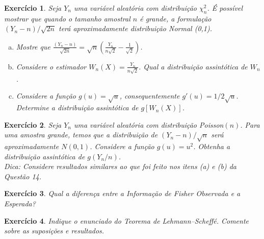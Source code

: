 \documentclass[letter,11pt]{article}
\newtheorem{exer}{Exercício}
\begin{document}
\begin{exer} \rm
Seja $Y_n$ uma variável aleatória com distribuição $\chi^2_n$. É possível mostrar que quando o tamanho amostral $n$ é grande, a formulação $(Y_n-n)/\sqrt{2n}$ terá aproximadamente distribuição Normal (0,1).
\begin{enumerate}[a)]
  \item Mostre que $\frac{(Y_n-n)}{\sqrt{2n}}=\sqrt{n}\left(\frac{Y_n}{n\sqrt{2}}-\frac{1}{\sqrt{2}} \right)$.
  \item Considere o estimador $W_n(X) = \frac{Y_n}{n\sqrt{2}}$. Qual a distribuição assintótica de $W_n$.
  \item Considere a função $g(u)=\sqrt{u}$, consequentemente $g'(u)=1/2\sqrt{u}$. Determine a distribuição assintótica de $g[W_n(X)]$.
\end{enumerate}
\end{exer}


\begin{exer} \rm
Seja $Y_n$ uma variável aleatória com distribuição Poisson$(n)$. Para uma amostra grande, temos que a distribuição de $(Y_n -n)/\sqrt{n}$ será aproximadamente $N(0, 1)$. Considere a função $g(u) = u^2$.
Obtenha a distribuição assintótica de $g(Y_n/n)$. \\
\noindent Dica: Considere resultados similares ao que foi feito nos itens (a) e (b) da Questão 14.
\end{exer}


\begin{exer} \rm
Qual a diferença entre a Informação de Fisher Observada e a Esperada?
\end{exer}


\begin{exer} \rm
Indique o enunciado do Teorema de Lehmann–Scheffé. Comente sobre as suposições e resultados.
\end{exer}
\end{document}
